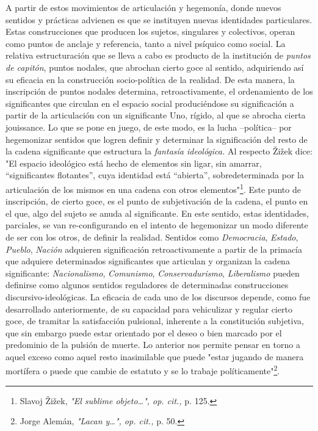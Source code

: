 \documentclass{book}
\begin{document}
A partir de estos movimientos de articulación y hegemonía, donde nuevos
sentidos y prácticas advienen es que se instituyen nuevas identidades
particulares. Estas construcciones que producen los sujetos, singulares
y colectivos, operan como puntos de anclaje y referencia, tanto a nivel
psíquico como social. La relativa estructuración que se lleva a cabo es
producto de la institución de \emph{puntos de capitón}, puntos nodales,
que abrochan cierto goce al sentido, adquiriendo así su eficacia en la
construcción socio-política de la realidad. De esta manera, la
inscripción de puntos nodales determina, retroactivamente, el
ordenamiento de los significantes que circulan en el espacio social
produciéndose su significación a partir de la articulación con un
significante Uno, rígido, al que se abrocha cierta jouissance. Lo que se
pone en juego, de este modo, es la lucha --política-- por hegemonizar
sentidos que logren definir y determinar la significación del resto de
la cadena significante que estructura la \emph{fantasía ideológica.} Al
respecto Žižek dice: "El espacio ideológico está hecho de elementos sin
ligar, sin amarrar, ``significantes flotantes'', cuya identidad está
``abierta'', sobredeterminada por la articulación de los mismos en una
cadena con otros elementos"\footnote{Slavoj Žižek, \emph{"El sublime
  objeto\ldots", op. cit.,} p. 125.}. Este punto de inscripción, de
cierto goce, es el punto de subjetivación de la cadena, el punto en el
que, algo del sujeto se anuda al significante. En este sentido, estas
identidades, parciales, se van re-configurando en el intento de
hegemonizar un modo diferente de ser con los otros, de definir la
realidad. Sentidos como \emph{Democracia}, \emph{Estado}, \emph{Pueblo},
\emph{Nación} adquieren significación retroactivamente a partir de la
primacía que adquiere determinados significantes que articulan y
organizan la cadena significante: \emph{Nacionalismo}, \emph{Comunismo},
\emph{Conservadurismo}, \emph{Liberalismo} pueden definirse como algunos
sentidos reguladores de determinadas construcciones
discursivo-ideológicas. La eficacia de cada uno de los discursos
depende, como fue desarrollado anteriormente, de su capacidad para
vehiculizar y regular cierto goce, de tramitar la satisfacción
pulsional, inherente a la constitución subjetiva, que sin embargo puede
estar orientado por el deseo o bien marcado por el predominio de la
pulsión de muerte. Lo anterior nos permite pensar en torno a aquel
exceso como aquel resto inasimilable que puede "estar jugando de manera
mortífera o puede que cambie de estatuto y se lo trabaje
políticamente"\footnote{Jorge Alemán, \emph{"Lacan y\ldots", op. cit.,}
  p. 50.}.
\end{document}
